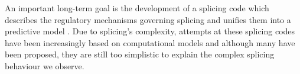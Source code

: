 An important long-term goal is the development of a splicing code which describes the regulatory mechanisms governing splicing and unifies them into a predictive model \cite{longtermcall}. Due to splicing's complexity, attempts at these splicing codes have been increasingly based on computational models \cite{barash2010a} and although many have been proposed, they are still too simplistic to explain the complex splicing behaviour we observe. %



%
%












